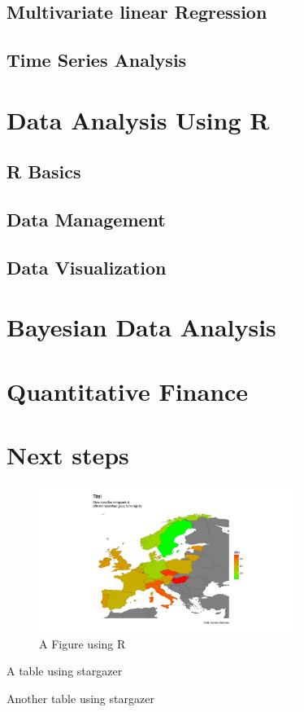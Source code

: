 \documentclass[14pt, a4paper]{article}
\begin{document}
\subsection{Multivariate linear Regression}

\subsection{Time Series Analysis}


\section{Data Analysis Using R}
\subsection{R Basics}
\subsection{Data Management}
\subsection{Data Visualization}


\section{Bayesian Data Analysis}


\section{Quantitative Finance}


\section{Next steps}







\begin{figure}
\caption{A Figure using R}
\centering
\includegraphics[width=0.75\textwidth]{results/figures/a3.pdf}
\end{figure}



\begin{table}
\begin{scriptsize}
%
\end{scriptsize}
\caption{A table using stargazer}
\end{table}

\begin{table}
\begin{scriptsize}
%
\end{scriptsize}
\caption{Another table using stargazer}
\end{table}

\newpage

\printbibliography
\end{document}
